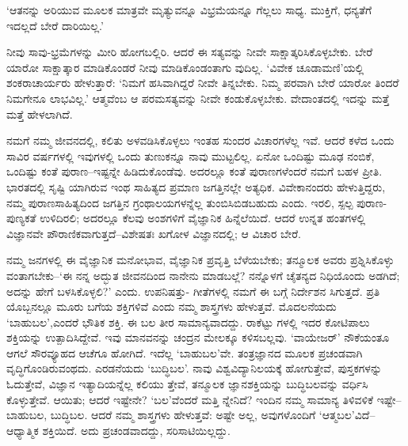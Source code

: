 ‘ಆತನನ್ನು ಅರಿಯುವ ಮೂಲಕ ಮಾತ್ರವೇ ಮೃತ್ಯುವನ್ನೂ ವಿಭ್ರಮೆಯನ್ನೂ ಗೆಲ್ಲಲು ಸಾಧ್ಯ. ಮುಕ್ತಿಗೆ, ಧನ್ಯತೆಗೆ ಇದಲ್ಲದೆ ಬೇರೆ ದಾರಿಯಿಲ್ಲ.’

ನೀವು ಸಾವು-ಭ್ರಮೆಗಳನ್ನು ಮೀರಿ ಹೋಗಬಲ್ಲಿರಿ. ಆದರೆ ಈ ಸತ್ಯವನ್ನು ನೀವೇ ಸಾಕ್ಷಾತ್ಕರಿಸಿಕೊಳ್ಳಬೇಕು. ಬೇರೆ ಯಾರೋ ಸಾಕ್ಷಾತ್ಕಾರ ಮಾಡಿಕೊಂಡರೆ ನೀವು ಮಾಡಿಕೊಂಡಂತಾಗು ವುದಿಲ್ಲ. ‘ವಿವೇಕ ಚೂಡಾಮಣಿ’ಯಲ್ಲಿ ಶಂಕರಾಚಾರ್ಯರು ಹೇಳುತ್ತಾರೆ: ‘ನಿಮಗೆ ಹಸಿವಾಗಿದ್ದರೆ ನೀವೇ ತಿನ್ನಬೇಕು. ನಿಮ್ಮ ಪರವಾಗಿ ಬೇರೆ ಯಾರೋ ತಿಂದರೆ ನಿಮಗೇನೂ ಲಾಭವಿಲ್ಲ.’ ಆತ್ಮವೆಂಬ ಆ ಪರಮಸತ್ಯವನ್ನು ನೀವೇ ಕಂಡುಕೊಳ್ಳಬೇಕು. ವೇದಾಂತದಲ್ಲಿ ಇದನ್ನು ಮತ್ತೆ ಮತ್ತೆ ಹೇಳಲಾಗಿದೆ. 

ನಮಗೆ ನಮ್ಮ ಜೀವನದಲ್ಲಿ, ಕಲಿತು ಅಳವಡಿಸಿಕೊಳ್ಳಲು ಇಂತಹ ಸುಂದರ ವಿಚಾರಗಳೆಲ್ಲ ಇವೆ. ಆದರೆ ಕಳೆದ ಒಂದು ಸಾವಿರ ವರ್ಷಗಳಲ್ಲಿ ಇವುಗಳಲ್ಲಿ ಒಂದು ತುಣುಕನ್ನೂ ನಾವು ಮುಟ್ಟಲಿಲ್ಲ. ಏನೋ ಒಂದಿಷ್ಟು ಮೂಢ ನಂಬಿಕೆ, ಒಂದಿಷ್ಟು ಕಂತೆ ಪುರಾಣ–ಇಷ್ಟನ್ನೇ ಹಿಡಿದುಕೊಂಡೆವು. ಅದರಲ್ಲೂ ಕಂತೆ ಪುರಾಣಗಳೆಂದರೆ ನಮಗೆ ಬಹಳ ಪ್ರೀತಿ. ಭಾರತದಲ್ಲಿ ಸೃಷ್ಟಿ ಯಾಗಿರುವ ಇಂಥ ಸಾಹಿತ್ಯದ ಪ್ರಮಾಣ ಜಗತ್ತಿನಲ್ಲೇ ಅತ್ಯಧಿಕ. ವಿವೇಕಾನಂದರು ಹೇಳುತ್ತಿದ್ದರು, ನಮ್ಮ ಪುರಾಣಸಾಹಿತ್ಯದಿಂದ ಜಗತ್ತಿನ ಗ್ರಂಥಾಲಯಗಳನ್ನೆಲ್ಲ ತುಂಬಿಸಿಬಿಡಬಹುದು ಎಂದು. ಇರಲಿ, ಸ್ಪಲ್ಪ ಪುರಾಣ-ಪುಣ್ಯಕತೆ ಉಳಿದಿರಲಿ; ಅದರಲ್ಲೂ ಕೆಲವು ಅಂಶಗಳಿಗೆ ವೈಜ್ಞಾನಿಕ ಹಿನ್ನೆಲೆಯಿದೆ. ಆದರೆ ಉನ್ನತ ಹಂತಗಳಲ್ಲಿ ವಿಜ್ಞಾನವೇ ಪೌರಾಣಿಕವಾಗುತ್ತದೆ–ವಿಶೇಷತಃ ಖಗೋಳ ವಿಜ್ಞಾನದಲ್ಲಿ; ಆ ವಿಚಾರ ಬೇರೆ.

ನಮ್ಮ ಜನಗಳಲ್ಲಿ ಈ ವೈಜ್ಞಾನಿಕ ಮನೋಭಾವ, ವೈಜ್ಞಾನಿಕ ಪ್ರವೃತ್ತಿ ಬೆಳೆಯಬೇಕು; ತನ್ಮೂಲಕ ಅವರು ಪ್ರಶ್ನಿಸಿಕೊಳ್ಳು ವಂತಾಗಬೇಕು–‘ಈ ನನ್ನ ಅದ್ಭುತ ಜೀವನದಿಂದ ನಾನೇನು ಮಾಡಬಲ್ಲೆ? ನನ್ನೊಳಗೆ ಚೈತನ್ಯದ ನಿಧಿಯೊಂದು ಅಡಗಿದೆ; ಅದನ್ನು ಹೇಗೆ ಬಳಸಿಕೊಳ್ಳಲಿ?’ ಎಂದು. ಉಪನಿಷತ್ತು- ಗೀತೆಗಳಲ್ಲಿ ನಮಗೆ ಈ ಬಗ್ಗೆ ನಿರ್ದೇಶನ ಸಿಗುತ್ತದೆ. ಪ್ರತಿ ಯೊಬ್ಬನಲ್ಲೂ ಮೂರು ಬಗೆಯ ಶಕ್ತಿಗಳಿವೆ ಎಂದು ನಮ್ಮ ಶಾಸ್ತ್ರಗಳು ಹೇಳುತ್ತವೆ. ಮೊದಲನೆಯದು ‘ಬಾಹುಬಲ’,ಎಂದರೆ ಭೌತಿಕ ಶಕ್ತಿ. ಈ ಬಲ ತೀರ ಸಾಮಾನ್ಯವಾದದ್ದು. ರಾಕೆಟ್ಟು ಗಳಲ್ಲಿ ಇದರ ಕೋಟಿಪಾಲು ಶಕ್ತಿಯನ್ನು ಉತ್ಪಾದಿಸಿದ್ದೇವೆ. ಇವು ಮಾನವನನ್ನು ಚಂದ್ರನ ಮೇಲಕ್ಕೂ ಕಳಿಸಬಲ್ಲವು. ‘ವಾಯೇಜರ್​’ ನೌಕೆಯಂತೂ ಆಗಲೆ ಸೌರವ್ಯೂಹದ ಆಚೆಗೂ ಹೋಗಿದೆ. ಇದೆಲ್ಲ ‘ಬಾಹುಬಲ’ವೇ. ತಂತ್ರಜ್ಞಾನದ ಮೂಲಕ ಪ್ರಚಂಡವಾಗಿ ವೃದ್ಧಿಗೊಂಡಿರುವಂಥದು. ಎರಡನೆಯದು ‘ಬುದ್ಧಿಬಲ’. ನಾವು ವಿಶ್ವವಿದ್ಯಾನಿಲಯಕ್ಕೆ ಹೋಗುತ್ತೇವೆ, ಪುಸ್ತಕಗಳನ್ನು ಓದುತ್ತೇವೆ, ವಿಜ್ಞಾನ ಇತ್ಯಾದಿಯನ್ನೆಲ್ಲ ಕಲಿಯು ತ್ತೇವೆ, ತನ್ಮೂಲಕ ಜ್ಞಾನಶಕ್ತಿಯನ್ನು ಬುದ್ಧಿಬಲವನ್ನು ವರ್ಧಿಸಿ ಕೊಳ್ಳುತ್ತೇವೆ. ಆಯಿತು; ಆದರೆ ಇಷ್ಟೇನೇ? ‘ಬಲ’ವೆಂದರೆ ಮತ್ತಿ ನ್ನೇನಿದೆ? ಇಂದಿನ ನಮ್ಮ ಸಾಮಾನ್ಯ ತಿಳಿವಳಿಕೆ ಇಷ್ಟೇ– ಬಾಹುಬಲ, ಬುದ್ಧಿಬಲ. ಆದರೆ ನಮ್ಮ ಶಾಸ್ತ್ರಗಳು ಹೇಳುತ್ತವೆ: ಅಷ್ಟೇ ಅಲ್ಲ, ಅವುಗಳೊಂದಿಗೆ ‘ಆತ್ಮಬಲ’ವಿದೆ– ಆಧ್ಯಾತ್ಮಿಕ ಶಕ್ತಿಯಿದೆ. ಅದು ಪ್ರಚಂಡವಾದದ್ದು, ಸರಿಸಾಟಿಯಿಲ್ಲದ್ದು.


